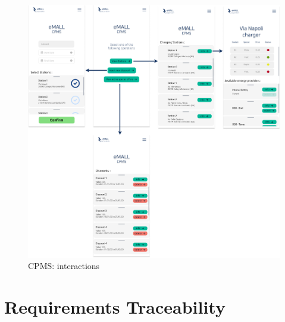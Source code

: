 \documentclass[table, 12pt]{article}
\begin{document}
\begin{center}
    \begin{figure}[H]
        \vspace{-50px}
        \includegraphics[scale=0.35, center]{assets/UI charts/CPMS interactions.png}
        \caption{CPMS: interactions}
        \label{fig: CPMSfunctions}
    \end{figure}
    \newpage
\end{center}


\section{Requirements Traceability}
\end{document}
